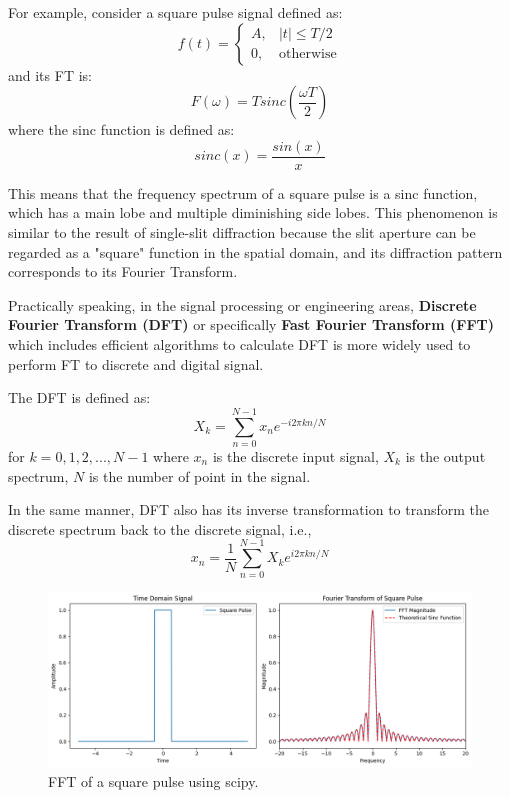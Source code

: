 \documentclass[12pt,a4paper]{article}
\begin{document}
\begin{CJK}{UTF8}{bkai}
For example, consider a square pulse signal defined as:
\begin{equation}
f(t) =
\begin{cases} 
A, & |t| \leq T/2 \\ 
0, & \text{otherwise}
\end{cases}
\end{equation}
and its FT is:
\begin{equation}
    F(\omega) = Tsinc\left(\frac{\omega T}{2}\right)
\end{equation}
where the sinc function is defined as:
\begin{equation}
    sinc(x) = \frac{sin(x)}{x}
\end{equation}

This means that the frequency spectrum of a square pulse is a sinc function, which has a main lobe and multiple diminishing side lobes.
This phenomenon is similar to the result of single-slit diffraction because the slit aperture can be regarded as a "square" function in the spatial domain, and its diffraction pattern corresponds to its Fourier Transform.

Practically speaking, in the signal processing or engineering areas, \textbf{Discrete Fourier Transform (DFT)} or specifically \textbf{Fast Fourier Transform (FFT)} which includes efficient algorithms to calculate DFT is more widely used to perform FT to discrete and digital signal.

The DFT is defined as:
\begin{equation}
    X_{k} = \sum_{n=0}^{N-1} x_n e^{-i2\pi k n/N}
\end{equation}
for $k= 0, 1, 2, ... ,N-1$ where $x_n$ is the discrete input signal, $X_k$ is the output spectrum, $N$ is the number of point in the signal.

In the same manner, DFT also has its inverse transformation to transform the discrete spectrum back to the discrete signal, i.e.,
\begin{equation}
    x_{n} = \frac{1}{N}\sum_{n=0}^{N-1} X_k e^{i2\pi k n/N}
\end{equation}

\begin{figure}[h]
    \centering
    \includegraphics[width=0.9\linewidth]{figures/fft_square_pulse.png}
    \caption{FFT of a square pulse using scipy.}
    \label{fig:fft_square}
\end{figure}


\end{CJK}
\end{document}

